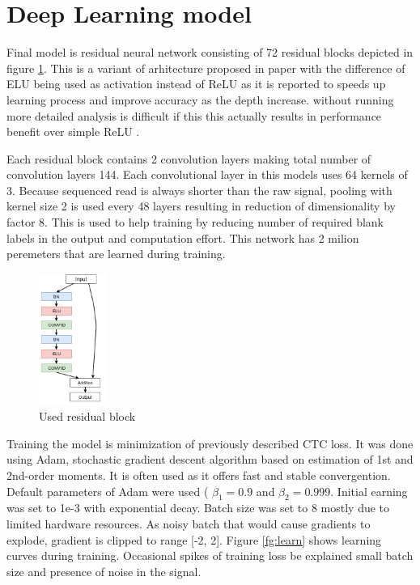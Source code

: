 \documentclass[times, utf8, diplomski, numeric, english]{fer}
\begin{document}
\section{Deep Learning model}

Final model is residual neural network consisting of 72 residual blocks depicted in figure \ref{fg:model_block}. This is a variant of arhitecture proposed in paper \cite{identitet} with the difference of ELU being used as activation instead of ReLU as it is reported\cite{resnet-elu} to speeds up learning process and improve accuracy as the depth increase. 
without running more detailed analysis is difficult if this this actually results in performance benefit over simple ReLU .

Each residual block contains 2 convolution layers making total number of convolution layers 144. Each convolutional layer in this models uses 64 kernels of 3. Because  sequenced read is always shorter than the raw signal, pooling with kernel size 2 is used every 48 layers resulting in reduction of dimensionality by factor 8. This is used to help training by reducing number of required blank labels in the output and computation effort. This network has 2 milion peremeters that are learned during training. 


\begin{figure}[!ht]
	\begin{center}
		\includegraphics[width=0.2\textwidth]{./imgs/model.png}
		\caption{Used residual block}
		\label{fg:model_block}
	\end{center}
\end{figure}


Training the model is minimization of previously described CTC loss. It was done using Adam, stochastic gradient descent algorithm based on estimation of 1st and 2nd-order moments.
It is often used as it offers fast and stable convergention. Default parameters of Adam were used (
$\beta_1=0.9$ and $\beta_2=0.999$. Initial earning was set to 1e-3 with exponential decay. Batch size was set to 8 mostly due to limited hardware resources. As noisy batch that would cause gradients to explode, gradient is clipped to range [-2, 2].
Figure \ref{fg:learn} shows learning curves during training. Occasional spikes of training loss be explained small batch size and presence of noise in the signal. 
\end{document}
